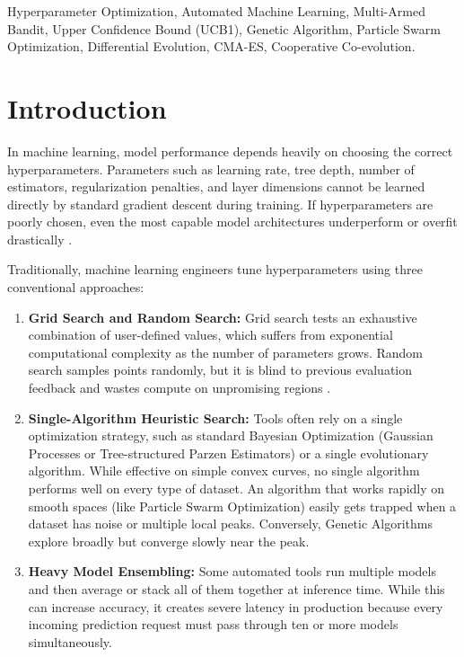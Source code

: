 \documentclass[conference]{IEEEtran}
\begin{document}
\begin{IEEEkeywords}
Hyperparameter Optimization, Automated Machine Learning, Multi-Armed Bandit, Upper Confidence Bound (UCB1), Genetic Algorithm, Particle Swarm Optimization, Differential Evolution, CMA-ES, Cooperative Co-evolution.
\end{IEEEkeywords}

\section{Introduction}
In machine learning, model performance depends heavily on choosing the correct hyperparameters. Parameters such as learning rate, tree depth, number of estimators, regularization penalties, and layer dimensions cannot be learned directly by standard gradient descent during training. If hyperparameters are poorly chosen, even the most capable model architectures underperform or overfit drastically \cite{feurer2019hyperparameter}.

Traditionally, machine learning engineers tune hyperparameters using three conventional approaches:
\begin{enumerate}
    \item \textbf{Grid Search and Random Search:} Grid search tests an exhaustive combination of user-defined values, which suffers from exponential computational complexity as the number of parameters grows. Random search samples points randomly, but it is blind to previous evaluation feedback and wastes compute on unpromising regions \cite{bergstra2012random}.
    \item \textbf{Single-Algorithm Heuristic Search:} Tools often rely on a single optimization strategy, such as standard Bayesian Optimization (Gaussian Processes or Tree-structured Parzen Estimators) or a single evolutionary algorithm. While effective on simple convex curves, no single algorithm performs well on every type of dataset. An algorithm that works rapidly on smooth spaces (like Particle Swarm Optimization) easily gets trapped when a dataset has noise or multiple local peaks. Conversely, Genetic Algorithms explore broadly but converge slowly near the peak.
    \item \textbf{Heavy Model Ensembling:} Some automated tools run multiple models and then average or stack all of them together at inference time. While this can increase accuracy, it creates severe latency in production because every incoming prediction request must pass through ten or more models simultaneously.
\end{enumerate}
\end{document}
